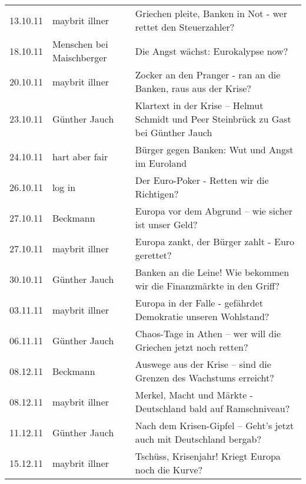 \begin{table}[!htp]
{\begin{tabular}{@{}lll@{}}
			13.10.11       & maybrit illner            & Griechen pleite, Banken in Not - wer rettet den Steuerzahler?                            \\
			18.10.11       & Menschen bei Maischberger & Die Angst wächst: Eurokalypse now?                                                       \\
			20.10.11       & maybrit illner            & Zocker an den Pranger - ran an die Banken, raus aus der Krise?                           \\
			23.10.11       & Günther Jauch             & Klartext in der Krise – Helmut Schmidt und Peer Steinbrück zu Gast bei Günther Jauch     \\
			24.10.11       & hart aber fair            & Bürger gegen Banken: Wut und Angst im Euroland                                           \\
			26.10.11       & log in                    & Der Euro-Poker - Retten wir die Richtigen?                                               \\
			27.10.11       & Beckmann                  & Europa vor dem Abgrund – wie sicher ist unser Geld?                                      \\
			27.10.11       & maybrit illner            & Europa zankt, der Bürger zahlt - Euro gerettet?                                          \\
			30.10.11       & Günther Jauch             & Banken an die Leine! Wie bekommen wir die Finanzmärkte in den Griff?                     \\
			03.11.11       & maybrit illner            & Europa in der Falle - gefährdet Demokratie unseren Wohlstand?                            \\
			06.11.11       & Günther Jauch             & Chaos-Tage in Athen – wer will die Griechen jetzt noch retten?                           \\
			08.12.11       & Beckmann                  & Auswege aus der Krise – sind die Grenzen des Wachstums erreicht?                         \\
			08.12.11       & maybrit illner            & Merkel, Macht und Märkte - Deutschland bald auf Ramschniveau?                            \\
			11.12.11       & Günther Jauch             & Nach dem Krisen-Gipfel – Geht's jetzt auch mit Deutschland bergab?                       \\
			15.12.11       & maybrit illner            & Tschüss, Krisenjahr! Kriegt Europa noch die Kurve?                                       \\

\end{tabular}}
\end{table}
